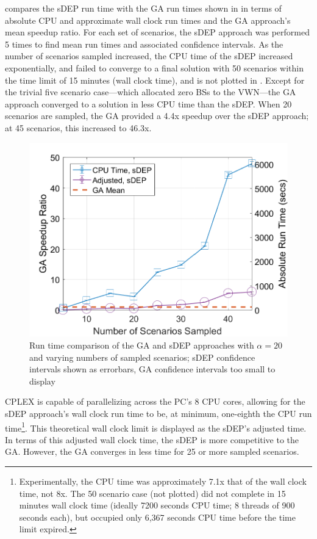 \documentclass[12pt,dvipsnames]{report}
\begin{document}
 compares the sDEP run time with the GA run times shown in  in terms of absolute CPU and approximate wall clock run times and the GA approach's mean speedup ratio.  For each set of scenarios, the sDEP approach was performed 5 times to find mean run times and associated confidence intervals.  As the number of scenarios sampled increased, the CPU time of the sDEP increased exponentially, and failed to converge to a final solution with 50 scenarios within the time limit of 15 minutes (wall clock time), and is not plotted in .  Except for the trivial five scenario case---which allocated zero BSs to the VWN---the GA approach converged to a solution in less CPU time than the sDEP.  When 20 scenarios are sampled, the GA provided a 4.4x speedup over the sDEP approach; at 45 scenarios, this increased to 46.3x.

\begin{figure}[ht]
	\centering
	\includegraphics[height=0.45\textheight]{Figures/Prelim_VOSGA_SpeedupRatio_AbsComp_alpha20}
	\caption[Preliminary simulation run time comparison of the GA and sDEP approaches with fixed $\alpha$]{Run time comparison of the GA and sDEP approaches with $\alpha = 20$ and varying numbers of sampled scenarios; sDEP confidence intervals shown as errorbars, GA confidence intervals too small to display}
	\label{fig:Prelim_AlgSpeedupRunTime}
\end{figure}

CPLEX is capable of parallelizing across the PC's 8 CPU cores, allowing for the sDEP approach's wall clock run time to be, at minimum, one-eighth the CPU run time\footnote{Experimentally, the CPU time was approximately 7.1x that of the wall clock time, not 8x.  The 50 scenario case (not plotted) did not complete in 15 minutes wall clock time (ideally 7200 seconds CPU time; 8 threads of 900 seconds each), but occupied only 6,367 seconds CPU time before the time limit expired.}.  This theoretical wall clock limit is displayed as the sDEP's adjusted time.  In terms of this adjusted wall clock time, the sDEP is more competitive to the GA.  However, the GA converges in less time for 25 or more sampled scenarios.
\end{document}
